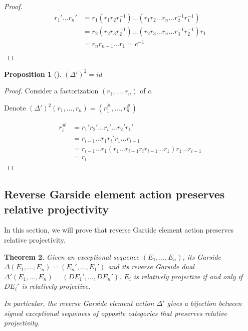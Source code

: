 \documentclass[11pt]{amsart}
\newtheorem{thm}{Theorem}[section]
\newtheorem{prop}[thm]{Proposition}%
\begin{document}
\begin{proof}
    \begin{equation}
    \begin{split}
    r_1'\dots r_n' & =r_1(r_1 r_2 r_1^{-1})\dots (r_1r_2\dots r_n \dots r_2^{-1} r_1^{-1}) \\
    & =r_2(r_2 r_3 r_2^{-1})\dots (r_2r_3\dots r_n \dots r_3^{-1} r_2^{-1})r_1 \\
    & =r_n r_{n-1} \dots r_1=c^{-1} \\
    \end{split}
    \end{equation}
\end{proof}

\begin{prop}[\cite{apostolakis2018duality}\cite{ojakian2019combinatorial}]
    $(\Delta')^2=id$
\end{prop}

\begin{proof}
    Consider a factorization $(r_1,\dots,r_n)$ of $c$. 
    
    Denote $(\Delta')^2(r_1,\dots,r_n)=(r_1^\#,\dots,r_n^\#)$

    \begin{equation}
    \begin{split}
    r_i^\# & = r_1' r_2' \dots r_i' \dots r_2' r_1' \\
    & =r_{i-1} \dots r_{1} r_i' r_{1} \dots r_{i-1} \\
    & =r_{i-1} \dots r_{1} (r_1 \dots r_{i-1} r_i r_{i-1} \dots r_1) r_1 \dots r_{i-1} \\
    & =r_i
    \end{split}
    \end{equation}    
\end{proof}

\subsection{Reverse Garside element action preserves relative projectivity}

In this section, we will prove that reverse Garside element action preserves relative projectivity.

\begin{thm}
    Given an exceptional sequence $(E_1,\dots,E_n)$, its Garside $\Delta(E_1,\dots,E_n)=(E_n',\dots,E_1')$ and its reverse Garside dual $\Delta'(E_1,\dots,E_n)=(DE_1',\dots,DE_n')$. $E_i$ is relatively projective if and only if $DE_i'$ is relatively projective.

    In particular, the reverse Garside element action $\Delta'$ gives a bijection between signed exceptional sequences of opposite categories that preserves relative projectivity. 
\end{thm}
\end{document}
